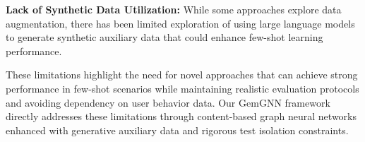 \textbf{Lack of Synthetic Data Utilization:} While some approaches explore data augmentation, there has been limited exploration of using large language models to generate synthetic auxiliary data that could enhance few-shot learning performance.

These limitations highlight the need for novel approaches that can achieve strong performance in few-shot scenarios while maintaining realistic evaluation protocols and avoiding dependency on user behavior data. Our GemGNN framework directly addresses these limitations through content-based graph neural networks enhanced with generative auxiliary data and rigorous test isolation constraints.

\EndChapter
